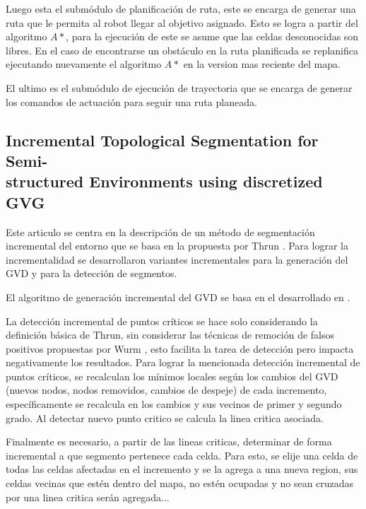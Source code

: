 Luego esta el submódulo de planificación de ruta, este se encarga de generar una ruta que le permita al robot llegar al objetivo asignado. Esto se logra a partir del algoritmo $A*$, para la ejecución de este se asume que las celdas desconocidas son libres. En el caso de encontrarse un obstáculo en la ruta planificada se replanifica ejecutando nuevamente el algoritmo $A*$ en la version mas reciente del mapa.

El ultimo es el submódulo de ejecución de trayectoria que se encarga de generar los comandos de actuación para seguir una ruta planeada.

\subsection[Incremental Topological Segmentation for Semi-structured Environments using discretized GVG]{Incremental Topological Segmentation for Semi-\\structured Environments using discretized GVG}

Este articulo se centra en la descripción de un método de segmentación incremental del entorno que se basa en la propuesta por Thrun \cite{Thrun1998}. Para lograr la incrementalidad se desarrollaron variantes incrementales para la generación del GVD y para la detección de segmentos.

El algoritmo de generación incremental del GVD se basa en el desarrollado en \cite{kalra2009incremental}. 

La detección incremental de puntos críticos se hace solo considerando la definición básica de Thrun, sin considerar las técnicas de remoción de falsos positivos propuestas por Wurm \cite{wurm2008coordinated}, esto facilita la tarea de detección pero impacta negativamente los resultados. Para lograr la mencionada detección incremental de puntos críticos, se recalculan los mínimos locales según los cambios del GVD (nuevos nodos, nodos removidos, cambios de despeje) de cada incremento, específicamente se recalcula en los cambios y sus vecinos de primer y segundo grado. Al detectar nuevo punto critico se calcula la linea critica asociada.

Finalmente es necesario, a partir de las lineas criticas, determinar de forma incremental a que segmento pertenece cada celda. Para esto, se elije una celda de todas las celdas afectadas en el incremento y se la agrega a una nueva region, sus celdas vecinas que estén dentro del mapa, no estén ocupadas y no sean cruzadas por una linea critica serán agregada...




